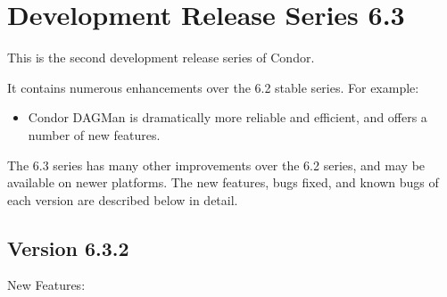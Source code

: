 \section{\label{sec:History-6-3}Development Release Series 6.3}

This is the second development release series of Condor.

It contains numerous enhancements over the 6.2 stable series.
For example:

\begin{itemize}

\item 
Condor DAGMan is dramatically more reliable and efficient, and offers
a number of new features.

\end{itemize}

The 6.3 series has many other improvements over the 6.2 series, and
may be available on newer platforms.  The new features, bugs fixed,
and known bugs of each version are described below in detail.


\subsection{\label{sec:New-6-3-2}Version 6.3.2}

\noindent New Features:

